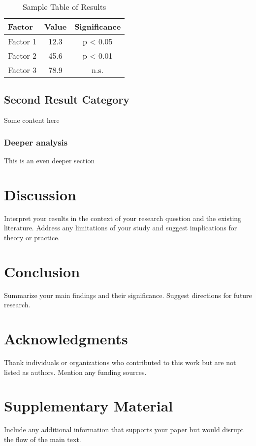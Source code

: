 \documentclass[12pt,a4paper]{article}
\begin{document}
\begin{table}[h]
\centering
\caption{Sample Table of Results}
\begin{tabular}{@{}lcc@{}}
\toprule
Factor & Value & Significance \\
\midrule
Factor 1 & 12.3 & p < 0.05 \\
Factor 2 & 45.6 & p < 0.01 \\
Factor 3 & 78.9 & n.s. \\
\bottomrule
\end{tabular}
\end{table}

\subsection{Second Result Category}


Some content here

\subsubsection{Deeper analysis}
This is an even deeper section

\section{Discussion}
Interpret your results in the context of your research question and the existing literature. Address any limitations of your study and suggest implications for theory or practice.

\section{Conclusion}
Summarize your main findings and their significance. Suggest directions for future research.

\section*{Acknowledgments}
Thank individuals or organizations who contributed to this work but are not listed as authors. Mention any funding sources.




\appendix
\section{Supplementary Material}
Include any additional information that supports your paper but would disrupt the flow of the main text.
\end{document}

